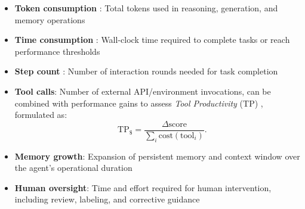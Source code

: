 \begin{itemize}

    \item \textbf{Token consumption} \citep{hu2024treeplannerefficientcloselooptask}: Total tokens used in reasoning, generation, and memory operations

    \item \textbf{Time consumption} \citep{lu2024axis}: Wall-clock time required to complete tasks or reach performance thresholds

    \item \textbf{Step count} \citep{wang2023voyager}: Number of interaction rounds needed for task completion

    \item \textbf{Tool calls}: Number of external API/environment invocations, can be combined with performance gains to assess \emph{Tool Productivity} (TP) \citep{wang2025otcpo}, formulated as:
\[\quad 
\mathrm{TP}_{\$}=\frac{\Delta \text{score}}{\sum_i \text{cost}(\text{tool}_i)}.
\]
    \item \textbf{Memory growth}: Expansion of persistent memory and context window over the agent's operational duration

    \item \textbf{Human oversight}: Time and effort required for human intervention, including review, labeling, and corrective guidance

\end{itemize}



